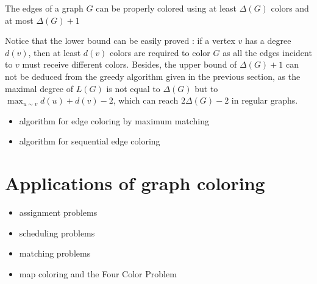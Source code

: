 \begin{theorem}[Vizing]
The edges of a graph $G$ can be properly colored using at least $\Delta(G)$ colors and at most $\Delta(G)+1$
\end{theorem}
Notice that the lower bound can be easily proved : if a vertex $v$ has a degree $d(v)$, then at least $d(v)$ colors are required to color $G$ as all the edges incident to $v$ must receive different colors. Besides, the upper bound of $\Delta(G)+1$ can not be deduced from the greedy algorithm given in the previous section, as the maximal degree of $L(G)$ is not equal to $\Delta(G)$ but to $\displaystyle \max_{u\sim v}d(u)+d(v)-2$, which can reach $2\Delta(G)-2$ in regular graphs.


\begin{itemize}
\item algorithm for edge coloring by maximum matching
\item algorithm for sequential edge coloring
\end{itemize}



\section{Applications of graph coloring}

\begin{itemize}
\item assignment problems

\item scheduling problems

\item matching problems

\item map coloring and the Four Color Problem
\end{itemize}
